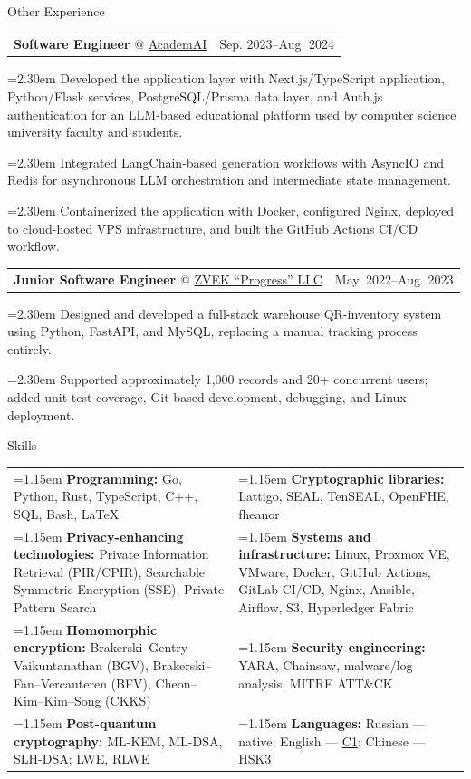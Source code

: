 \documentclass[11pt,a4paper]{article}
\makeatletter
\newcommand{\cvrow}[2]{%
  \noindent
  \begin{minipage}[t]{0.145\textwidth}
    \vspace{0pt}%
    \raggedright
    \fontsize{10.5}{12.5}\selectfont
    #1
  \end{minipage}%
  \hfill
  \begin{minipage}[t]{0.835\textwidth}
    \vspace{0pt}%
    #2
  \end{minipage}\par
}
\newcommand{\skillcell}[2]{%
  \noindent
  \hangindent=1.15em
  \hangafter=1
  \makebox[1.15em][l]{$\diamond$}%
  \textbf{#1} #2%
}
\newcommand{\workentry}[2]{%
  \noindent
  \begin{tabularx}{\linewidth}
    {@{}X@{\hspace{0.8em}}r@{}}
    #1 & \small #2
  \end{tabularx}\par
  \vspace{0.15em}
}
\newcommand{\workproject}[1]{%
  \noindent
  \hangindent=2.30em
  \hangafter=1
  \hspace*{1.15em}\makebox[1.15em][l]{$\diamond$}#1\par
  \vspace{0.12em}
}
\makeatother
\begin{document}
\vspace{0.50em}

\cvrow{Other Experience}{%
  \workentry
    {\textbf{Software Engineer} @ \href{https://academai.ru/}{AcademAI}}
    {Sep. 2023--Aug. 2024}
  \workproject{Developed the application layer with Next.js/TypeScript application,
  Python/Flask services, PostgreSQL/Prisma data layer, and Auth.js authentication
  for an LLM-based educational platform used by computer science university faculty
  and students.}
  \workproject{Integrated LangChain-based generation workflows with AsyncIO and Redis for
  asynchronous LLM orchestration and intermediate state management.}
  \workproject{Containerized the application with Docker, configured Nginx, deployed
  to cloud-hosted VPS infrastructure, and built the GitHub Actions CI/CD workflow.}
}

\cvrow{}{%
  \workentry
    {\textbf{Junior Software Engineer} @
    \href{https://zvekprogress.ru/}{ZVEK ``Progress'' LLC}}
    {May. 2022--Aug. 2023}

  \workproject{Designed and developed a full-stack warehouse QR-inventory system
  using Python, FastAPI, and MySQL, replacing a manual tracking process entirely.}

  \workproject{Supported approximately 1,000 records and 20+ concurrent users;
  added unit-test coverage, Git-based development, debugging, and Linux deployment.}
}
\vspace{0.75em}

\cvrow{Skills}{%
  \begin{tabularx}{\linewidth}
    {@{}>{\raggedright\arraybackslash}X
    @{\hspace{1.2em}}
    >{\raggedright\arraybackslash}X@{}}

    \skillcell{Programming:}{%
      Go, Python, Rust, TypeScript, C++, SQL, Bash, LaTeX}
    &
    \skillcell{Cryptographic libraries:}{%
      Lattigo, SEAL, TenSEAL, OpenFHE, fheanor}
    \\[0.20em]

    \skillcell{Privacy-enhancing technologies:}{%
      Private Information Retrieval (PIR/CPIR),
      Searchable Symmetric Encryption (SSE),
      Private Pattern Search}
    &
    \skillcell{Systems and infrastructure:}{%
      Linux, Proxmox VE, VMware, Docker,
      GitHub Actions, GitLab CI/CD, Nginx, Ansible,
      Airflow, S3, Hyperledger Fabric}
    \\[0.20em]

    \skillcell{Homomorphic encryption:}{%
      Brakerski--Gentry--Vaikuntanathan (BGV),
      Brakerski--Fan--Vercauteren (BFV),
      Cheon--Kim--Kim--Song (CKKS)}
    &
    \skillcell{Security engineering:}{%
      YARA, Chainsaw, malware/log analysis,
      MITRE ATT\&CK}
    \\[0.20em]

    \skillcell{Post-quantum cryptography:}{%
      ML-KEM, ML-DSA, SLH-DSA; LWE, RLWE}
    &
    \skillcell{Languages:}{%
      Russian --- native;
      English --- \href{https://iasenovets.github.io/files/toefl_8cd5f4a2b8ec8f34da49ea0faeef43f1.pdf}{C1};
      Chinese --- \href{https://admin.chinesetest.cn/queryScore.do?sid=c2tActR9Wb\%2704b861aefbdc5e9fd0b44afa717d08cbceb0720e582ce25f\%2724d7sWsQ5nVUQSwD}{HSK3}}
  \end{tabularx}
}
\end{document}
